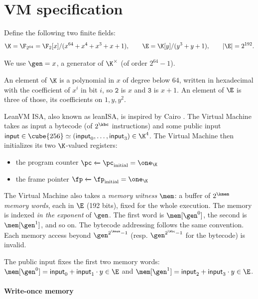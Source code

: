 \section{VM specification}\label{sec:vm}

Define the following two finite fields:
\[
  \K=\F_{2^{64}}=\F_2[x]/(x^{64}+x^4+x^3+x+1),
  \qquad
  \E=\K[y]/(y^3+y+1),
  \qquad |\E|=2^{192}.
\]

We use $\gen = x$, a generator of $\K^{\times}$ (of order $2^{64}-1$).

An element of $\K$ is a polynomial in $x$ of degree below $64$, written in hexadecimal with the coefficient of $x^{i}$ in bit $i$, so $\mathtt{2}$ is $x$ and $\mathtt{3}$ is $x+1$. An element of $\E$ is three of those, its coefficients on $1,y,y^{2}$.
 
\vspace{5mm}

LeanVM ISA, also known as leanISA, is inspired by Cairo \cite{cairo}. The Virtual Machine takes as input a bytecode (of $2^{\kbc}$ instructions) and some public input $\textsf{input} \in \cube{256} \simeq (\textsf{input}_0, \dots, \textsf{input}_3) \in \K^4$. The Virtual Machine then initializes its two $\K$-valued registers:
\begin{itemize}
  \item the program counter $\pc \xleftarrow{} \pc_{\mathrm{initial}} = \one_\K$
  \item the frame pointer $\fp \xleftarrow{} \fp_{\mathrm{initial}} = \one_\K$
\end{itemize}

The Virtual Machine also takes a \textit{memory witness} $\mem$: a buffer of $2^{\kmem}$ \textit{memory words}, each in $\E$ (192 bits), fixed for the whole execution. The memory is indexed \textit{in the exponent} of $\gen$. The first word is $\mem[\gen^0]$, the second is $\mem[\gen^1]$, and so on. The bytecode addressing follows the same convention. Each memory access beyond $\gen^{2^{\kmem}-1}$ (resp. $\gen^{2^{\kbc}-1}$ for the bytecode) is invalid.

The public input fixes the first two memory words: $\mem[\gen^0] = \textsf{input}_0 + \textsf{input}_1 \cdot y \in \E$ and $\mem[\gen^1] = \textsf{input}_2 + \textsf{input}_3 \cdot y \in \E$.

\paragraph{Write-once memory}

